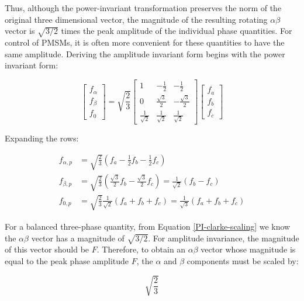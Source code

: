 \documentclass{article}
\begin{document}
Thus, although the power-invariant transformation preserves the norm of the original three dimensional vector, the magnitude of the resulting rotating $\alpha\beta$ vector is $\sqrt{3/2}$ times the peak amplitude of the individual phase quantities. For control of PMSMs, it is often more convenient for these quantities to have the same amplitude. Deriving the amplitude invariant form begins with the power invariant form:

\begin{equation}
    \begin{bmatrix}
        f_{\alpha} \\
        f_{\beta} \\
        f_{0}
    \end{bmatrix}
    =
    \sqrt{\frac{2}{3}}
    \begin{bmatrix}
        1 & -\frac{1}{2} & -\frac{1}{2} \\[2mm]
        0 & \frac{\sqrt{3}}{2} & -\frac{\sqrt{3}}{2} \\[2mm]
        \frac{1}{\sqrt{2}} & \frac{1}{\sqrt{2}} & \frac{1}{\sqrt{2}}
    \end{bmatrix}
    \begin{bmatrix}
        f_a \\
        f_b \\
        f_c
    \end{bmatrix}
\end{equation}

Expanding the rows:

\begin{align}
    f_{\alpha,p} &= \sqrt{\frac{2}{3}}\left( f_a - \frac{1}{2}f_b - \frac{1}{2}f_c \right) \\[4pt]
    f_{\beta,p} &= \sqrt{\frac{2}{3}}\left( \frac{\sqrt{3}}{2}f_b - \frac{\sqrt{3}}{2}f_c \right) =  \frac{1}{\sqrt{2}}(f_b - f_c)\\[4pt]
    f_{0,p} &= \sqrt{\frac{2}{3}}\frac{1}{\sqrt{2}} \left( f_a + f_b + f_c \right) = \frac{1}{\sqrt{3}}(f_a + f_b + f_c)
\end{align}

For a balanced three-phase quantity, from Equation \ref{PI-clarke-scaling} we know the $\alpha\beta$ vector has a magnitude of $\sqrt{3/2}$. For amplitude invariance, the magnitude of this vector should be $F$. Therefore, to obtain an $\alpha\beta$ vector whose magnitude is equal to the peak phase amplitude $F$, the $\alpha$ and $\beta$ components must be scaled by:

\begin{equation}
    \sqrt{\frac{2}{3}}
\end{equation}
\end{document}
